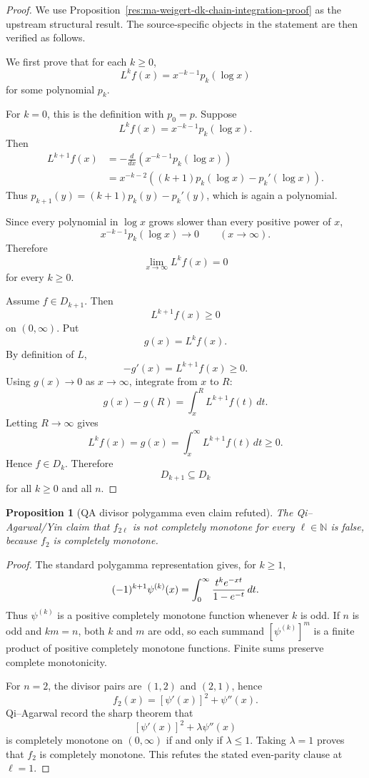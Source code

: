 \documentclass[11pt]{article}
\numberwithin{equation}{section}
\newtheorem{proposition}[theorem]{Proposition}
\theoremstyle{definition}
\theoremstyle{remark}
\newcommand{\1}{\mathbf 1}
\begin{document}
\begin{proof}
We use Proposition~\ref{res:ma-weigert-dk-chain-integration-proof} as the upstream structural result. The source-specific objects in the statement are then verified as follows.

We first prove that for each \(k\ge0\),
\[
L^k f(x)=x^{-k-1}p_k(\log x)
\]
for some polynomial \(p_k\).

For \(k=0\), this is the definition with \(p_0=p\).  Suppose
\[
L^k f(x)=x^{-k-1}p_k(\log x).
\]
Then
\[
\begin{aligned}
L^{k+1}f(x)
&=-\frac{d}{dx}\left(x^{-k-1}p_k(\log x)\right)\\
&=x^{-k-2}\left((k+1)p_k(\log x)-p_k'(\log x)\right).
\end{aligned}
\]
Thus \(p_{k+1}(y)=(k+1)p_k(y)-p_k'(y)\), which is again a polynomial.

Since every polynomial in \(\log x\) grows slower than every positive power of \(x\),
\[
x^{-k-1}p_k(\log x)\to0
\qquad (x\to\infty).
\]
Therefore
\[
\lim_{x\to\infty}L^k f(x)=0
\]
for every \(k\ge0\).

Assume \(f\in D_{k+1}\).  Then
\[
L^{k+1}f(x)\ge0
\]
on \((0,\infty)\).  Put
\[
g(x)=L^k f(x).
\]
By definition of \(L\),
\[
-g'(x)=L^{k+1}f(x)\ge0.
\]
Using \(g(x)\to0\) as \(x\to\infty\), integrate from \(x\) to \(R\):
\[
g(x)-g(R)=\int_x^R L^{k+1}f(t)\,dt.
\]
Letting \(R\to\infty\) gives
\[
L^k f(x)=g(x)=\int_x^\infty L^{k+1}f(t)\,dt\ge0.
\]
Hence \(f\in D_k\).  Therefore
\[
D_{k+1}\subseteq D_k
\]
for all \(k\ge0\) and all \(n\).
\end{proof}

\begin{proposition}[QA divisor polygamma even claim refuted]
\label{res:qa-divisor-polygamma-even-claim-refuted}
The Qi--Agarwal/Yin claim that \(f_{2\ell}\) is not completely monotone for every \(\ell\in\mathbb N\) is false, because \(f_2\) is completely monotone.
\end{proposition}

\begin{proof}
The standard polygamma representation gives, for \(k\ge1\),
\[
 (-1)^{k+1}\psi^{(k)}(x)
 =\int_0^\infty {t^ke^{-xt}\over1-e^{-t}}\,dt .
\]
Thus \(\psi^{(k)}\) is a positive completely monotone function whenever
\(k\) is odd.  If \(n\) is odd and \(km=n\), both \(k\) and \(m\) are odd, so
each summand \([\psi^{(k)}]^m\) is a finite product of positive completely
monotone functions.  Finite sums preserve complete monotonicity.

For \(n=2\), the divisor pairs are \((1,2)\) and \((2,1)\), hence
\[
 f_2(x)=[\psi'(x)]^2+\psi''(x).
\]
Qi--Agarwal record the sharp theorem that
\[
 [\psi'(x)]^2+\lambda\psi''(x)
\]
is completely monotone on \((0,\infty)\) if and only if \(\lambda\le1\).
Taking \(\lambda=1\) proves that \(f_2\) is completely monotone.  This refutes
the stated even-parity clause at \(\ell=1\).
\end{proof}
\end{document}

